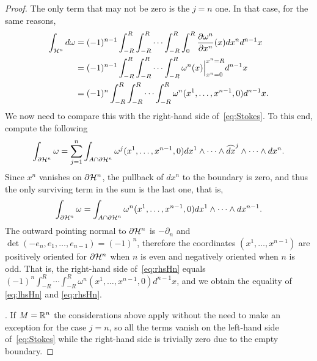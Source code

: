 \begin{proof}
	The only term that may not be zero is the $j=n$ one.
	In that case, for the same reasons,
	\begin{align}
		\int_{\cH^n} d\omega
		 & =(-1)^{n-1} \int_{-R}^R\int_{-R}^R\cdots\int_{-R}^R\int_{0}^{R}\frac{\partial \omega^n}{\partial x^n}(x) dx^n d^{n-1} x \\ %
		 & =(-1)^{n-1} \int_{-R}^R\int_{-R}^R\cdots\int_{-R}^R \omega^n(x)\Big|_{x^n=0}^{x^n=R} d^{n-1} x                     \\ %
		 & =(-1)^{n} \int_{-R}^R\int_{-R}^R\cdots\int_{-R}^R \omega^n(x^1, \ldots, x^{n-1}, 0) d^{n-1} x                         %
		.\label{eq:lhsHn}
	\end{align}
	We now need to compare this with the right-hand side of~\eqref{eq:Stokes}.
	To this end, compute the following
	\begin{equation}
		\int_{\partial \mathcal{H}^n}\omega = \sum_{j=1}^n \int_{A\cap\partial\mathcal{H}^n} \omega^j(x^1, \ldots, x^{n-1}, 0) dx^1 \wedge \cdots\wedge \widehat{dx}^j \wedge \cdots\wedge dx^n.
	\end{equation}
	Since $x^n$ vanishes on $\partial\mathcal{H}^n$, the pullback of $dx^n$ to the boundary is zero, and thus the only surviving term in the sum is the last one, that is,
	\begin{equation}\label{eq:rhsHn}
		\int_{\partial \mathcal{H}^n}\omega = \int_{A\cap\partial\mathcal{H}^n} \omega^n(x^1, \ldots, x^{n-1}, 0) dx^1 \wedge\cdots\wedge dx^{n-1}.
	\end{equation}
	The outward pointing normal to $\partial\mathcal{H}^n$ is $-\partial_n$ and $\det(-e_n, e_1, \ldots, e_{n-1}) = (-1)^n$, therefore the coordinates $(x^1, \ldots, x^{n-1})$ are positively oriented for $\partial\mathcal{H}^n$ when $n$ is even and negatively oriented when $n$ is odd.
	That is, the right-hand side of~\eqref{eq:rhsHn} equals $(-1)^n \int_{-R}^R\cdots\int_{-R}^R \omega^n(x^1, \ldots, x^{n-1}, 0) d^{n-1} x$, and we obtain the equality of \eqref{eq:lhsHn} and \eqref{eq:rhsHn}.

	.
	If $M=\mathbb{R}^n$ the considerations above apply without the need to make an exception for the case $j=n$, so all the terms vanish on the left-hand side of~\eqref{eq:Stokes} while the right-hand side is trivially zero due to the empty boundary.


\end{proof}
